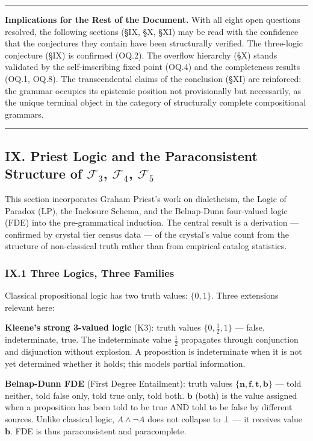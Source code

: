 \documentclass[12pt,a4paper]{article}
\begin{document}
\begin{center}
\rule{0.5\textwidth}{0.4pt}
\end{center}

\textbf{Implications for the Rest of the Document.} With all eight open questions resolved, the following sections (\S IX, \S X, \S XI) may be read with the confidence that the conjectures they contain have been structurally verified. The three-logic conjecture (\S IX) is confirmed (OQ.2). The overflow hierarchy (\S X) stands validated by the self-imscribing fixed point (OQ.4) and the completeness results (OQ.1, OQ.8). The transcendental claims of the conclusion (\S XI) are reinforced: the grammar occupies its epistemic position not provisionally but necessarily, as the unique terminal object in the category of structurally complete compositional grammars.

\begin{center}
\rule{0.5\textwidth}{0.4pt}
\end{center}

\subsection{IX. Priest Logic and the Paraconsistent Structure of \texorpdfstring{$\mathcal{F}_3$, $\mathcal{F}_4$, $\mathcal{F}_5$}{F3, F4, F5}}

This section incorporates Graham Priest's work on dialetheism, the Logic of Paradox (LP), the Inclosure Schema, and the Belnap-Dunn four-valued logic (FDE) into the pre-grammatical induction. The central result is a derivation --- confirmed by crystal tier census data --- of the crystal's value count from the structure of non-classical truth rather than from empirical catalog statistics.

\subsubsection{IX.1 Three Logics, Three Families}

Classical propositional logic has two truth values: $\{0, 1\}$. Three extensions relevant here:

\textbf{Kleene's strong 3-valued logic} (K3): truth values $\{0, \frac{1}{2}, 1\}$ --- false, indeterminate, true. The indeterminate value $\frac{1}{2}$ propagates through conjunction and disjunction without explosion. A proposition is indeterminate when it is not yet determined whether it holds; this models partial information.

\textbf{Belnap-Dunn FDE} (First Degree Entailment): truth values $\{\mathbf{n}, \mathbf{f}, \mathbf{t}, \mathbf{b}\}$ --- told neither, told false only, told true only, told both. $\mathbf{b}$ (both) is the value assigned when a proposition has been told to be true AND told to be false by different sources. Unlike classical logic, $A \wedge \neg A$ does not collapse to $\bot$ --- it receives value $\mathbf{b}$. FDE is thus paraconsistent and paracomplete.
\end{document}
